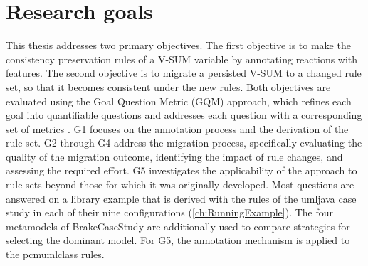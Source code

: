 \section{Research goals}
\label{sec:Introduction:ResearchGoals}

This thesis addresses two primary objectives.
The first objective is to make the consistency preservation rules of a V-SUM variable by annotating reactions with features.
The second objective is to migrate a persisted V-SUM to a changed rule set, so that it becomes consistent under the new rules.
Both objectives are evaluated using the Goal Question Metric (GQM) approach, which refines each goal into quantifiable questions and addresses each question with a corresponding set of metrics \cite{basili1992gqm}.
G1 focuses on the annotation process and the derivation of the rule set.
G2 through G4 address the migration process, specifically evaluating the quality of the migration outcome, identifying the impact of rule changes, and assessing the required effort.
G5 investigates the applicability of the approach to rule sets beyond those for which it was originally developed.
Most questions are answered on a library example that is derived with the rules of the umljava case study \cite{vitruv-casestudies-fork} in each of their nine configurations (\autoref{ch:RunningExample}).
The four metamodels of BrakeCaseStudy are additionally used to compare strategies for selecting the dominant model.
For G5, the annotation mechanism is applied to the pcmumlclass rules.

